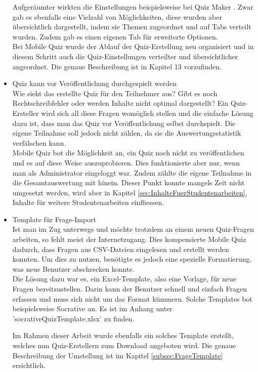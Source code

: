 \begin{itemize}
		Aufgeräumter wirkten die Einstellungen beispielsweise bei Quiz Maker \cite{quiz-maker}. Zwar gab es ebenfalls eine Vielzahl von Möglichkeiten, diese wurden aber übersichtlich dargestellt, indem sie Themen zugeordnet und auf Tabs verteilt wurden. Zudem gab es einen eigenen Tab für erweiterte Optionen. \\
		Bei Mobile Quiz wurde der Ablauf der Quiz-Erstellung neu organisiert und in diesem Schritt auch die Quiz-Einstellungen verteilter und übersichtlicher angeordnet. Die genaue Beschreibung ist in Kapitel 13 vorzufinden. 
		
		
		
		\item Quiz kann vor Veröffentlichung durchgespielt werden \\
		Wie sieht das erstellte Quiz für den Teilnehmer aus? Gibt es noch Rechtschreibfehler oder werden Inhalte nicht optimal dargestellt? Ein Quiz-Ersteller wird sich all diese Fragen womöglich stellen und die einfache Lösung dazu ist, dass man das Quiz vor Veröffentlichung selbst durchspielt. Die eigene Teilnahme soll jedoch nicht zählen, da sie die Auswertungsstatistik verfälschen kann. \\
		Mobile Quiz bot die Möglichkeit an, ein Quiz noch nicht zu veröffentlichen und es auf diese Weise auszuprobieren. Dies funktionierte aber nur, wenn man als Administrator eingeloggt war. Zudem zählte die eigene Teilnahme in die Gesamtauswertung mit hinein.
		Dieser Punkt konnte mangels Zeit nicht umgesetzt werden, wird aber in Kapitel \ref{sec:InhalteFuerStudentenarbeiten}, Inhalte für weitere Studentenarbeiten einfliessen.
		
		
		\item Template für Frage-Import \\
		Ist man im Zug unterwegs und möchte trotzdem an einem neuen Quiz-Fragen arbeiten, so fehlt meist der Internetzugang. Dies kompensierte Mobile Quiz dadurch, dass Fragen aus CSV-Dateien eingelesen und erstellt werden konnten. Um dies zu nutzen, benötigte es jedoch eine spezielle Formatierung, was neue Benutzer abschrecken konnte. \\
		Die Lösung dazu war es, ein Excel-Template, also eine Vorlage, für neue Fragen bereitzustellen. Darin kann der Benutzer schnell und einfach Fragen erfassen und muss sich nicht um das Format kümmern. Solche Templates bot beispielsweise
		Socrative \cite{socrative.com} an. Es ist im Anhang unter 'socrativeQuizTemplate.xlsx' zu finden. 
		
		Im Rahmen dieser Arbeit wurde ebenfalls ein solches Template erstellt, welches nun Quiz-Erstellern zum Download angeboten wird. Die genaue Beschreibung der Umstellung ist im Kapitel \ref{subsec:FrageTemplate} ersichtlich.
		
	\end{itemize}